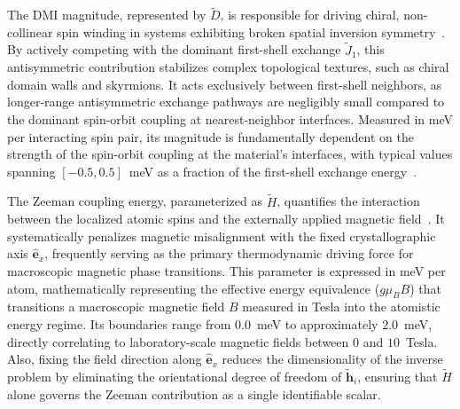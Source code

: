 \documentclass[a4paper,fleqn]{cas-sc}
\begin{document}
The DMI magnitude, represented by $\tilde{D}$, is responsible for driving chiral, non-collinear spin winding in systems exhibiting broken spatial inversion symmetry~\cite{fert2017magnetic}. By actively competing with the dominant first-shell exchange $\tilde{J}_1$, 
this antisymmetric contribution stabilizes complex topological textures, such as chiral domain walls and skyrmions. It acts exclusively between first-shell neighbors, as longer-range antisymmetric exchange pathways are negligibly small compared to the dominant spin-orbit coupling at nearest-neighbor interfaces. Measured in meV per interacting spin pair, its magnitude is fundamentally dependent on the strength of the spin-orbit coupling 
at the material's interfaces, with typical values spanning 
$[-0.5, 0.5]$~meV as a fraction of the first-shell exchange 
energy~\cite{fert2017magnetic}.

The Zeeman coupling energy, parameterized as $\tilde{H}$, quantifies the interaction between the localized atomic spins and the externally applied magnetic field~\cite{evans2014atomistic}. It systematically 
penalizes magnetic misalignment with the fixed crystallographic axis $\hat{\mathbf{e}}_x$, frequently serving as the primary thermodynamic driving force for macroscopic magnetic phase transitions. This 
parameter is expressed in meV per atom, mathematically representing the effective energy equivalence ($g\mu_B B$) that transitions a macroscopic magnetic field $B$ measured in Tesla into the atomistic energy regime. Its boundaries range from $0.0$~meV to approximately $2.0$~meV, directly correlating to laboratory-scale magnetic fields 
between $0$ and $10$~Tesla. Also, fixing the field direction along $\hat{\mathbf{e}}_x$ reduces the dimensionality of the inverse problem by eliminating the orientational degree of freedom of $\tilde{\mathbf{h}}_i$, ensuring that $\tilde{H}$ alone governs the Zeeman contribution as a single identifiable scalar.
\end{document}
